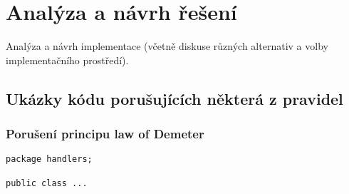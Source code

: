 \chapter{Analýza a návrh řešení}
Analýza a návrh implementace (včetně diskuse různých alternativ a volby implementačního prostředí).

\section{Ukázky kódu porušujících některá z pravidel}

\subsection{Porušení principu law of Demeter}

\begin{verbatim}
package handlers;

public class ...

\end{verbatim}
